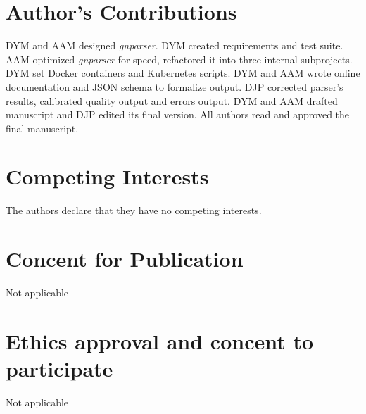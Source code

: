 \documentclass{bmcart}
\begin{document}
\section*{Author's Contributions}

DYM and AAM designed \textit{gnparser}. DYM created requirements and test suite. AAM optimized \textit{gnparser} for speed, refactored it into three internal subprojects. DYM set Docker containers and Kubernetes scripts. DYM and AAM wrote online documentation and JSON schema to formalize output. DJP corrected parser's results, calibrated quality output and errors output. DYM and AAM drafted manuscript and DJP edited its final version. All authors read and approved the final manuscript.

\section*{Competing Interests}

The authors declare that they have no competing interests.

\section*{Concent for Publication}

Not applicable

\section*{Ethics approval and concent to participate}

Not applicable

\end{document}
